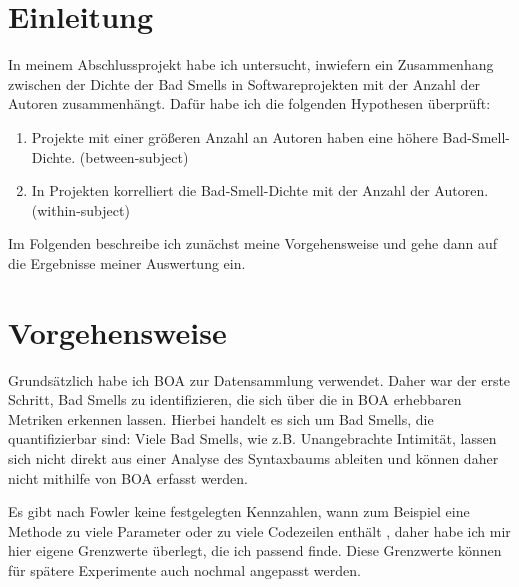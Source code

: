 \documentclass[12pt]{article}
\date{}
\begin{document}
\section{Einleitung}
In meinem Abschlussprojekt habe ich untersucht, inwiefern ein Zusammenhang zwischen der Dichte der Bad Smells in Softwareprojekten mit der Anzahl der Autoren zusammenhängt.
Dafür habe ich die folgenden Hypothesen überprüft:
\begin{enumerate}
	\item Projekte mit einer größeren Anzahl an Autoren haben eine höhere Bad-Smell-Dichte. (between-subject)
	\item In Projekten korrelliert die Bad-Smell-Dichte mit der Anzahl der Autoren. (within-subject)
\end{enumerate}

Im Folgenden beschreibe ich zunächst meine Vorgehensweise und gehe dann auf die Ergebnisse meiner Auswertung ein.

\section{Vorgehensweise}
Grundsätzlich habe ich BOA \cite{boa} zur Datensammlung verwendet.
Daher war der erste Schritt, Bad Smells zu identifizieren, die sich über die in BOA erhebbaren Metriken erkennen lassen.
Hierbei handelt es sich um Bad Smells, die quantifizierbar sind:
Viele Bad Smells, wie z.B. Unangebrachte Intimität, lassen sich nicht direkt aus einer Analyse des Syntaxbaums ableiten und können daher nicht mithilfe von BOA erfasst werden.

Es gibt nach Fowler keine festgelegten Kennzahlen, wann zum Beispiel eine Methode zu viele Parameter oder zu viele Codezeilen enthält \cite{fowler2018refactoring}, daher habe ich mir hier eigene Grenzwerte überlegt, die ich passend finde.
Diese Grenzwerte können für spätere Experimente auch nochmal angepasst werden.
\end{document}
